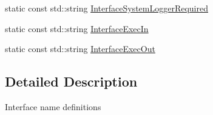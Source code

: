 \begin{DoxyCompactItemize}
\item 
static const std\-::string \hyperlink{classmts_manager_component_base_1_1_interface_names_ac9a7050301a0c9b7a3f91b8b5655d209}{Interface\-System\-Logger\-Required}
\item 
static const std\-::string \hyperlink{classmts_manager_component_base_1_1_interface_names_af3b8c25884d04f284baeb57265124743}{Interface\-Exec\-In}
\item 
static const std\-::string \hyperlink{classmts_manager_component_base_1_1_interface_names_a6c03e2f64b187041b1ed618725460f92}{Interface\-Exec\-Out}
\end{DoxyCompactItemize}


\subsection{Detailed Description}
Interface name definitions 

